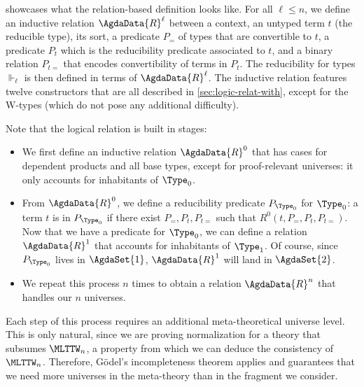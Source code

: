  showcases what the relation-based definition
looks like.
%
For all \( \ell \le n \), we define an inductive relation \( \AgdaData{R}^\ell \) between
a context, an untyped term \( t \) (the reducible type), its sort, a predicate \( P_{=} \) of
types that are convertible to \( t \), a predicate \( P_{t} \) which is the
reducibility predicate associated to \( t \), and a binary relation
\( P_{t=} \) that encodes convertibility of terms in \( P_{t} \).
%
The reducibility for types \( \Vdash_\ell \) is then defined in terms of \( \AgdaData{R}^\ell \).
%
The inductive relation features twelve constructors that are all
described in \cref{sec:logic-relat-with}, except for the \( \mathrm{W} \)-types
(which do not pose any additional difficulty).

Note that the logical relation is built in stages:
\begin{itemize}
\item We first define an inductive relation
  \( \AgdaData{R}^0 \) that has cases for dependent products and all base types, except
  for proof-relevant universes: it only accounts for inhabitants of
  \( \Type_0 \).
\item From \( \AgdaData{R}^0 \), we define a reducibility predicate \( P_{\Type_0} \) for
  \( \Type_0 \): a term \( t \) is in \( P_{\Type_0} \) if there exist
  \( P_=, P_t, P_{t=} \) such that \( R^0(t,P_=, P_t, P_{t=}) \).
  Now that we have a predicate for \( \Type_0 \), we can define a relation
  \( \AgdaData{R}^1 \) that accounts for inhabitants of \( \Type_1 \). Of course, since
  \( P_{\Type_0} \) lives in \( \AgdaSet{1} \), \( \AgdaData{R}^1 \) will land in \( \AgdaSet{2} \).
\item We repeat this process \( n \) times to obtain a relation \( \AgdaData{R}^n \)
  that handles our \( n \) universes.
\end{itemize}
Each step of this process requires an additional meta-theoretical universe
level.
%
This is only natural, since we are proving normalization for a theory that
subsumes \( \MLTTW_n \), a property from which we can deduce the consistency
of \( \MLTTW_n \).
%
Therefore, Gödel's incompleteness theorem applies and guarantees that
we need more universes in the meta-theory than in the fragment we
consider.



